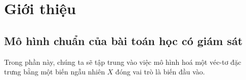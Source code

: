 \chapter{Giới thiệu}

\section{Mô hình chuẩn của bài toán học có giám sát}

Trong phần này, chúng ta sẽ tập trung vào việc mô hình hoá một véc-tơ đặc trưng bằng một biến ngẫu nhiên $X$ đóng vai trò là biến đầu vào.

